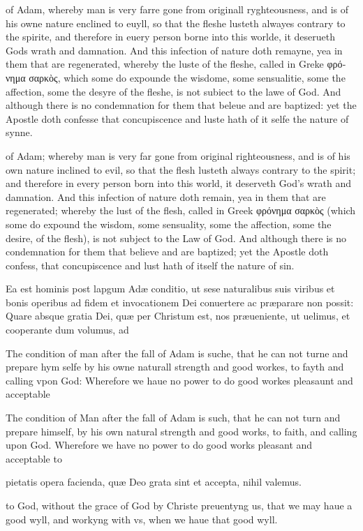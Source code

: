 of Adam, whereby man is very farre gone from originall ryghteousness, and is of his owne nature enclined to euyll, so that the fleshe lusteth alwayes contrary to the spirite, and therefore in euery person borne into this worlde, it deserueth Gods wrath and damnation. And this infection of nature doth remayne, yea in them that are regenerated, whereby the luste of the fleshe, called in Greke \textgreek{φρόνημα σαρκὸς}, which some do expounde the wisdome, some sensualitie, some the affection, some the desyre of the fleshe, is not subiect to the lawe of God. And although there is no condemnation for them that beleue and are baptized: yet the Apostle doth confesse that concupiscence and luste hath of it selfe the nature of synne.

of Adam; whereby man is very far gone from original righteousness, and is of his own nature inclined to evil, so that the flesh lusteth always contrary to the spirit; and therefore in every person born into this world, it deserveth God's wrath and damnation. And this infection of nature doth remain, yea in them that are regenerated; whereby the lust of the flesh, called in Greek \textgreek{φρόνημα σαρκὸς} (which some do expound the wisdom, some sensuality, some the affection, some the desire, of the flesh), is not subject to the Law of God. And although there is no condemnation for them that believe and are baptized; yet the Apostle doth confess, that concupiscence and lust hath of itself the nature of sin.


Ea est hominis post lapgum Adæ conditio, ut sese naturalibus suis viribus et bonis operibus ad fidem et invocationem Dei conuertere ac præparare non possit: Quare absque gratia Dei, quæ per Christum est, nos præueniente, ut uelimus, et cooperante dum volumus, ad

The condition of man after the fall of Adam is suche, that he can not turne and prepare hym selfe by his owne naturall strength and good workes, to fayth and calling vpon God: Wherefore we haue no power to do good workes pleasaunt and acceptable

The condition of Man after the fall of Adam is such, that he can not turn and prepare himself, by his own natural strength and good works, to faith, and calling upon God. Wherefore we have no power to do good works pleasant and acceptable to

pietatis opera facienda, quæ Deo grata sint et accepta, nihil valemus.

to God, without the grace of God by Christe preuentyng us, that we may haue a good wyll, and workyng with vs, when we haue that good wyll.

